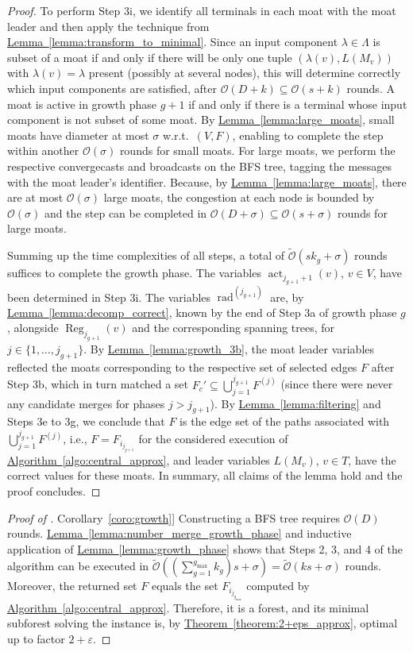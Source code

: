 \documentclass[letterpaper,11pt]{article}
\newcommand{\namedref}[2]{\hyperref[#2]{#1~\ref*{#2}}}
\newcommand{\theoremref}[1]{\namedref{Theorem}{#1}}
\newcommand{\lemmaref}[1]{\namedref{Lemma}{#1}}
\newcommand{\corollaryref}[1]{\namedref{Corollary}{#1}}
\newcommand{\algref}[1]{\namedref{Algorithm}{#1}}
\newcommand{\BO}{\mathcal{O}}
\newcommand{\sO}{\tilde{\mathcal{O}}}
\newcommand{\Comp}{\lambda}
\DeclareMathOperator{\act}{act}
\DeclareMathOperator{\moat}{rad}
\DeclareMathOperator{\reg}{Reg}
\begin{document}
\begin{proof}
To perform Step 3i, we identify all terminals in each moat with the moat leader
and then apply the technique from \lemmaref{lemma:transform_to_minimal}. Since
an input component $\Comp\in \Lambda$ is subset of a moat if and only if there
will be only one tuple $(\Comp(v),L(M_v))$ with $\Comp(v)=\Comp$ present
(possibly at several nodes), this will determine correctly which input
components are satisfied, after $\BO(D+k)\subseteq \BO(s+k)$ rounds. A moat is
active in growth phase $g+1$ if and only if there is a terminal whose input
component is not subset of some moat. By \lemmaref{lemma:large_moats}, small
moats have diameter at most $\sigma$ w.r.t.\ $(V,F)$, enabling to complete the
step within another $\BO(\sigma)$ rounds for small moats. For large moats, we
perform the respective convergecasts and broadcasts on the BFS tree, tagging
the messages with the moat leader's identifier. Because, by
\lemmaref{lemma:large_moats}, there are at most $\BO(\sigma)$ large moats, the
congestion at each node is bounded by $\BO(\sigma)$ and the step can be
completed in $\BO(D+\sigma)\subseteq \BO(s+\sigma)$ rounds for large moats.

Summing up the time complexities of all steps, a total of $\sO(sk_g+\sigma)$
rounds suffices to complete the growth phase. The variables
$\act_{j_{g+1}+1}(v)$, $v\in V$, have been determined in Step 3i. The variables
$\moat^{(j_{g+1})}$ are, by \lemmaref{lemma:decomp_correct}, known by the end of
Step 3a of growth phase $g$, alongside $\reg_{j_{g+1}}(v)$ and the corresponding
spanning trees, for $j\in \{1,\ldots,j_{g+1}\}$. By \lemmaref{lemma:growth_3b},
the moat leader variables reflected the moats corresponding to the respective
set of selected edges $F$ after Step 3b, which in turn matched a set
$F_c'\subseteq \bigcup_{j=1}^{j_{g+1}}F^{(j)}$ (since there were never any
candidate merges for phases $j>j_{g+1}$). By \lemmaref{lemma:filtering} and
Steps 3e to 3g, we conclude that $F$ is the edge set of the paths associated
with $\bigcup_{j=1}^{j_{g+1}}F^{(j)}$, i.e., $F=F_{i_{j_{g+1}}}$ for the
considered execution of \algref{algo:central_approx}, and leader variables
$L(M_v)$, $v\in T$, have the correct values for these moats. In summary, all
claims of the lemma hold and the proof concludes.
\end{proof}


\begin{proof}[Proof of \corollaryref{coro:growth}]
Constructing a BFS tree requires $\BO(D)$ rounds.
\lemmaref{lemma:number_merge_growth_phase} and inductive application of
\lemmaref{lemma:growth_phase} shows that Steps 2, 3, and 4 of the algorithm can
be executed in $\sO((\sum_{g=1}^{g_{\max}}k_g)s+\sigma)=\sO(ks+\sigma)$ rounds.
Moreover, the returned set $F$ equals the set $F_{i_{j_{g_{\max}}}}$ computed by
\algref{algo:central_approx}. Therefore, it is a forest, and its minimal
subforest solving the instance is, by \theoremref{theorem:2+eps_approx}, optimal
up to factor $2+\varepsilon$.
\end{proof}
\end{document}
